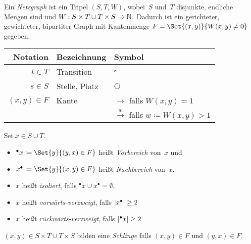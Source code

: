 \documentclass{cheat-sheet}
\newcommand{\transition}{\square} %
\newcommand{\place}{\bigcirc} %
\newcommand{\preset}[1]{{}^\bullet{#1}} %
\newcommand{\postset}[1]{{#1}^\bullet} %
\begin{document}
\raggedcolumns %



\begin{defn}
  Ein \emph{Netzgraph} ist ein Tripel $(S, T, W)$, wobei~$S$ und~$T$ disjunkte, endliche Mengen sind und $W : S \times T \cup T \times S \to \mathbb{N}$.
  Dadurch ist ein gerichteter, gewichteter, bipartiter Graph mit Kantenmenge $F = \Set{(x, y)}{W(x, y) \neq 0}$ gegeben.
\end{defn}

\begin{center}
  \begin{tabular}{r l l}
    Notation & Bezeichnung & Symbol \\ \hline
    $t \in T$ & Transition & $\transition$ \\
    $s \in S$ & Stelle, Platz & $\place$ \\
    $(x, y) \in F$ & Kante & $\xrightarrow{\enspace}$ falls $W(x, y) = 1$ \\
    && $\xrightarrow{w}$ falls $w \coloneqq W(x, y) > 1$
  \end{tabular}
\end{center}

\begin{defn}
  Sei $x \in S \cup T$.
  \begin{itemize}
    \item $\preset{x} \coloneqq \Set{y}{(y, x) \in F}$ heißt \emph{Vorbereich} von~$x$ und
    \item $\postset{x} \coloneqq \Set{y}{(x, y) \in F}$ heißt \emph{Nachbereich} von~$x$.
    \item $x$ heißt \emph{isoliert}, falls $\preset{x} \cup \postset{x} = \emptyset$.
    \item $x$ heißt \emph{vorwärts-verzweigt}, falls $\card{\postset{x}} \geq 2$ 
    \item $x$ heißt \emph{rückwärts-verzweigt}, falls $\card{\preset{x}} \geq 2$ 
  \end{itemize}
\end{defn}

\begin{defn}
  $(x, y) \in S \times T \cup T \times S$ bilden eine \emph{Schlinge} falls $(x, y) \in F$ und $(y, x) \in F$.
\end{defn}
\end{document}
